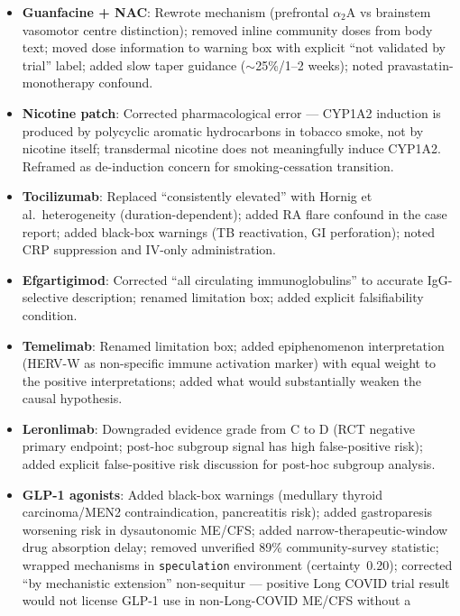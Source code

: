 \begin{itemize}
\begin{itemize}
        added psychosis/bipolar contraindication.
      \item \textbf{Guanfacine + NAC}: Rewrote mechanism (prefrontal $\alpha_2$A vs brainstem vasomotor
        centre distinction); removed inline community doses from body text; moved dose information
        to warning box with explicit ``not validated by trial'' label; added slow taper guidance
        ($\sim$25\%/1--2 weeks); noted pravastatin-monotherapy confound.
      \item \textbf{Nicotine patch}: Corrected pharmacological error --- CYP1A2 induction is produced
        by polycyclic aromatic hydrocarbons in tobacco smoke, not by nicotine itself; transdermal
        nicotine does not meaningfully induce CYP1A2. Reframed as de-induction concern for
        smoking-cessation transition.
      \item \textbf{Tocilizumab}: Replaced ``consistently elevated'' with Hornig et al.\ heterogeneity
        (duration-dependent); added RA flare confound in the case report; added black-box warnings
        (TB reactivation, GI perforation); noted CRP suppression and IV-only administration.
      \item \textbf{Efgartigimod}: Corrected ``all circulating immunoglobulins'' to accurate IgG-selective
        description; renamed limitation box; added explicit falsifiability condition.
      \item \textbf{Temelimab}: Renamed limitation box; added epiphenomenon interpretation (HERV-W as
        non-specific immune activation marker) with equal weight to the positive interpretations;
        added what would substantially weaken the causal hypothesis.
      \item \textbf{Leronlimab}: Downgraded evidence grade from C to D (RCT negative primary endpoint;
        post-hoc subgroup signal has high false-positive risk); added explicit false-positive
        risk discussion for post-hoc subgroup analysis.
      \item \textbf{GLP-1 agonists}: Added black-box warnings (medullary thyroid carcinoma/MEN2
        contraindication, pancreatitis risk); added gastroparesis worsening risk in dysautonomic
        ME/CFS; added narrow-therapeutic-window drug absorption delay; removed unverified 89\%
        community-survey statistic; wrapped mechanisms in \texttt{speculation} environment
        (certainty~0.20); corrected ``by mechanistic extension'' non-sequitur --- positive Long
        COVID trial result would not license GLP-1 use in non-Long-COVID ME/CFS without a

\end{itemize}
\end{itemize}
